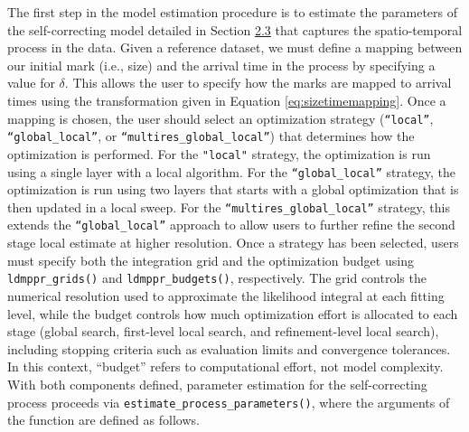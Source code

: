 {The first step in the model estimation procedure is to estimate the
parameters of the self-correcting model detailed in Section \hyperref[selfcorrecting]{2.3} that captures the spatio-temporal process in the
data. Given a reference dataset, we must define a mapping between our
initial mark (i.e., size) and the arrival time in the process by specifying a value for \(\delta\). This allows the user to
specify how the marks are mapped to arrival times using the
transformation given in Equation \eqref{eq:sizetimemapping}. Once a mapping is
chosen, the user should select an optimization strategy (\texttt{“local”}, \texttt{“global\_local”}, or \texttt{“multires\_global\_local”}) that determines how the optimization is performed. For the \texttt{"local"} strategy, the optimization is run using a single layer with a local algorithm. For the \texttt{“global\_local”} strategy, the optimization is run using two layers that starts with a global optimization that is then updated in a local sweep. For the \texttt{“multires\_global\_local”} strategy, this extends the \texttt{“global\_local”} approach to allow users to further refine the second stage local estimate at higher resolution. Once a strategy has been selected, users must specify both the integration grid and the optimization budget using \texttt{ldmppr\_grids()} and \texttt{ldmppr\_budgets()}, respectively. The grid controls the numerical resolution used to approximate the likelihood integral at each fitting level, while the budget controls how much optimization effort is allocated to each stage (global search, first-level local search, and refinement-level local search), including stopping criteria such as evaluation limits and convergence tolerances. In this context, ``budget'' refers to computational effort, not model complexity. With both components defined, parameter estimation for the self-correcting process proceeds via \texttt{estimate\_process\_parameters()}, where the arguments of the function are defined as follows.}

